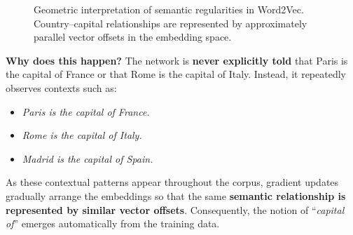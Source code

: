 \begin{figure}[!htp]
    \caption{Geometric interpretation of semantic regularities in Word2Vec. Country--capital relationships are represented by approximately parallel vector offsets in the embedding space.}
    \label{fig:word2vec-country-capital-regularity}
\end{figure}

\noindent
\textcolor{Green3}{ \textbf{Why does this happen?}} The network is \textbf{never explicitly told} that Paris is the capital of France or that Rome is the capital of Italy. Instead, it repeatedly observes contexts such as:
\begin{itemize}
    \item \emph{Paris is the capital of France.}
    \item \emph{Rome is the capital of Italy.}
    \item \emph{Madrid is the capital of Spain.}
\end{itemize}
As these contextual patterns appear throughout the corpus, gradient updates gradually arrange the embeddings so that the same \textbf{semantic relationship is represented by similar vector offsets}. Consequently, the notion of ``\emph{capital of}'' emerges automatically from the training data.


